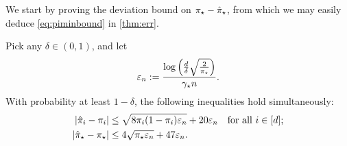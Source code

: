 We start by proving the deviation bound on $\pi_{\star}-\hat\pi_{\star}$, from
which we may easily deduce \cref{eq:piminbound} in \cref{thm:err}.
\begin{lemma}
  \label{lem:hatpimin}
  Pick any $\delta \in (0,1)$, and let
  \begin{equation}
    \varepsilon_n :=
    \frac{ \log\left(\frac{d}\delta\sqrt{\frac{2}{\pi_{\star}}}\right) }{\gamma_{\star} n}
    .
    \label{eq:singleton-veps}
  \end{equation}
  With probability at least $1-\delta$, the following inequalities
  hold simultaneously:
  \begin{align}
    \left|\hat{\pi}_i-\pi_i\right|
    & \le
    \sqrt{8\pi_i(1-\pi_i) \varepsilon_n}
    + 20 \varepsilon_n
    \quad \text{for all $i \in [d]$}
    ;
    \label{eq:singletonboundsimple}
    \\
    \left|\hat\pi_{\star} - \pi_{\star}\right|
    & \leq
    4\sqrt{\pi_{\star}\varepsilon_n}
    + 47\varepsilon_n
    .
    \label{eq:hatpimin}
  \end{align}
\end{lemma}
